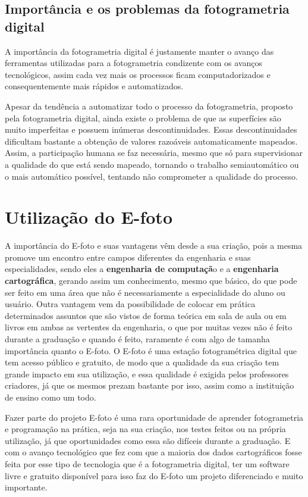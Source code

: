 \subsection{Importância e os problemas da fotogrametria digital}
A importância da fotogrametria digital é justamente manter o avanço das ferramentas utilizadas para a fotogrametria condizente com os avanços tecnológicos, assim cada vez mais os processos ficam computadorizados e consequentemente mais rápidos e automatizados.

Apesar da tendência a automatizar todo o processo da fotogrametria, proposto pela fotogrametria digital, ainda existe o problema de que as superfícies são muito imperfeitas e possuem inúmeras descontinuidades. Essas descontinuidades dificultam bastante a obtenção de valores razoáveis automaticamente mapeados. Assim, a participação humana se faz necessária, mesmo que só para supervisionar a qualidade do que está sendo mapeado, tornando o trabalho semiautomático ou o mais automático possível, tentando não comprometer a qualidade do processo.


\section{Utilização do E-foto}

A importância do E-foto e suas vantagens vêm desde a sua criação, pois a mesma promove um encontro entre campos diferentes da engenharia e suas especialidades, sendo eles a \textbf{engenharia de computaçã}o e a \textbf{engenharia cartográfica}, gerando assim um conhecimento, mesmo que básico, do que pode ser feito em uma área que não é necessariamente a especialidade do aluno ou usuário. Outra vantagem vem da possibilidade de colocar em prática determinados assuntos que são vistos de forma teórica em sala de aula ou em livros em ambas as vertentes da engenharia, o que por muitas vezes não é feito durante a graduação e quando é feito, raramente é com algo de tamanha importância quanto o E-foto. O E-foto é uma estação fotogramétrica digital que tem acesso público e gratuito, de modo que a qualidade da sua criação tem grande impacto em sua utilização, e essa qualidade é exigida pelos professores criadores, já que os mesmos prezam bastante por isso, assim como a instituição de ensino como um todo.

Fazer parte do projeto E-foto é uma rara oportunidade de aprender fotogrametria e programação na prática, seja na sua criação, nos testes feitos ou na própria utilização, já que oportunidades como essa são difíceis durante a graduação. E com o avanço tecnológico que fez com que a maioria dos dados cartográficos fosse feita por esse tipo de tecnologia que é a fotogrametria digital, ter um software livre e gratuito disponível para isso faz do E-foto um projeto diferenciado e muito importante. %


